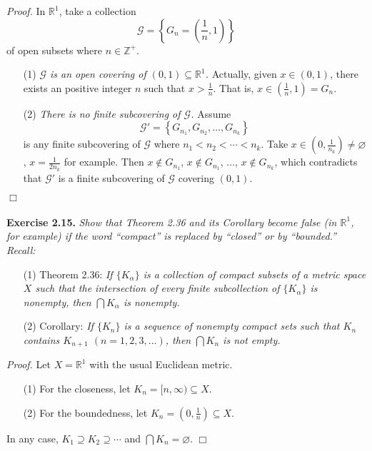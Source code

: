 \documentclass{article}
\begin{document}
\emph{Proof.}
In $\mathbb{R}^1$, take a collection
$$\mathscr{G} = \left\{ G_n = \left(\frac{1}{n}, 1\right) \right\}$$
of open subsets where $n \in \mathbb{Z}^+$.
\begin{enumerate}
\item[(1)]
\emph{$\mathscr{G}$ is an open covering of $(0, 1) \subseteq \mathbb{R}^1$.}
Actually, given $x \in (0, 1)$, there exists an positive integer $n$ such that $x > \frac{1}{n}$.
That is, $x \in \left(\frac{1}{n}, 1\right) = G_n$.
\item[(2)]
\emph{There is no finite subcovering of $\mathscr{G}$.}
Assume $$\mathscr{G}' = \left\{ G_{n_1}, G_{n_2}, \ldots, G_{n_k} \right\}$$
is any finite subcovering of $\mathscr{G}$ where $n_1 < n_2 < \cdots < n_k$.
Take $x \in \left(0, \frac{1}{n_k}\right) \neq \varnothing$,
$x = \frac{1}{2 n_k}$ for example.
Then $x \not\in G_{n_1}$, $x \not\in G_{n_1}$, $\ldots$, $x \not\in G_{n_k}$,
which contradicts that $\mathscr{G}'$ is a finite subcovering of $\mathscr{G}$ covering $(0, 1)$.
\end{enumerate}
$\Box$ \\\\






\textbf{Exercise 2.15.}
\emph{
Show that Theorem 2.36 and its Corollary become false
(in $\mathbb{R}^1$, for example) if the word ``compact''
is replaced by ``closed'' or by ``bounded.''} \\

\emph{Recall:}
\begin{enumerate}
\item[(1)]
Theorem 2.36:
\emph{If $\{K_\alpha\}$ is a collection of compact subsets of a metric space $X$
such that the intersection of every finite subcollection of $\{K_\alpha\}$ is nonempty,
then $\bigcap K_\alpha$ is nonempty.}
\item[(2)]
Corollary:
\emph{If $\{K_n\}$ is a sequence of nonempty compact sets such that $K_n$
contains $K_{n+1}$ $(n=1,2,3,\ldots)$, then $\bigcap K_n$ is not empty.} \\
\end{enumerate}

\emph{Proof.}
Let $X = \mathbb{R}^1$ with the usual Euclidean metric.
\begin{enumerate}
\item[(1)]
For the closeness, let $K_n = [n,\infty) \subseteq X$.
\item[(2)]
For the boundedness, let $K_n = \left(0, \frac{1}{n}\right) \subseteq X$.
\end{enumerate}
In any case, $K_1 \supseteq K_2 \supseteq \cdots$ and $\bigcap K_n = \varnothing$.
$\Box$ \\\\
\end{document}
